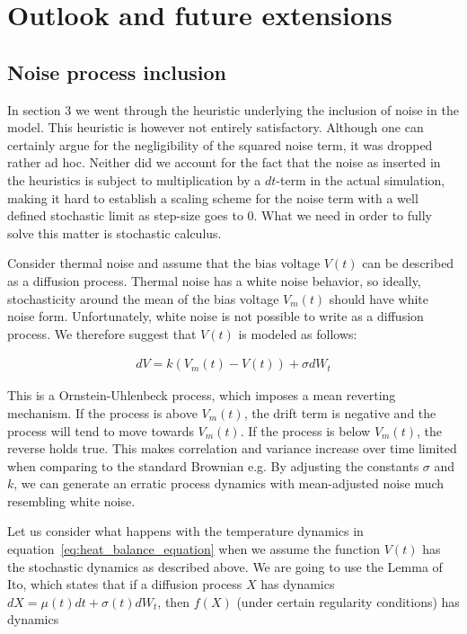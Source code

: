 \section{Outlook and future extensions}

\subsection{Noise process inclusion}
In section 3 we went through the heuristic underlying the inclusion of
noise in the model. This heuristic is however not entirely
satisfactory. Although one can certainly argue for the negligibility
of the squared noise term, it was dropped rather ad hoc. Neither did
we account for the fact that the noise as inserted in the heuristics
is subject to multiplication by a $dt$-term in the actual simulation,
making it hard to establish a scaling scheme for the noise term with a
well defined stochastic limit as step-size goes to 0. What we need in
order to fully solve this matter is stochastic calculus.


Consider thermal noise and assume that the bias voltage $V(t)$ can be
described as a diffusion process. Thermal noise has a white noise
behavior, so ideally, stochasticity around the mean of the bias
voltage $V_{m}(t)$ should have white noise form. Unfortunately, white
noise is not possible to write as a diffusion process. We therefore
suggest that $V(t)$ is modeled as follows:


\begin{align*}
d V = k(V_{m}(t)-V(t)) + \sigma dW_{t}
\end{align*}

This is a Ornstein-Uhlenbeck process, which imposes a mean reverting
mechanism. If the process is above $V_m(t)$, the drift term is
negative and the process will tend to move towards $V_m(t)$. If the
process is below $V_m(t)$, the reverse holds true. This makes
correlation and variance increase over time limited when comparing to the
standard Brownian e.g. By adjusting the constants $\sigma$ and $k$, we
can generate an erratic process dynamics with mean-adjusted noise much
resembling white noise.


Let us consider what happens with the temperature dynamics in
equation~\eqref{eq:heat_balance_equation} when we assume the function
$V(t)$ has the stochastic dynamics as described above. We are going to
use the Lemma of Ito, which states that if a diffusion process $X$ has
dynamics $dX = \mu(t)dt + \sigma(t)dW_{t}$, then $f(X)$ (under certain
regularity conditions) has dynamics


